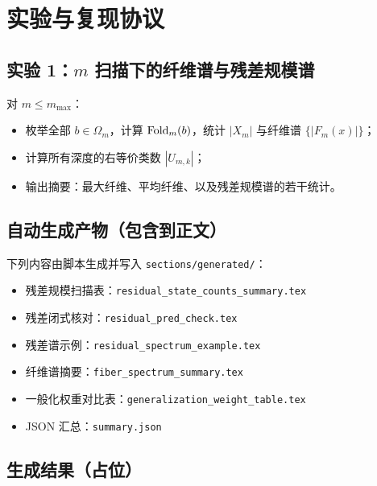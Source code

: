 \section{实验与复现协议}\label{sec:exp}

\subsection{\texorpdfstring{实验 1：$m$ 扫描下的纤维谱与残差规模谱}{实验 1：m 扫描下的纤维谱与残差规模谱}}
对 $m\le m_{\max}$：
\begin{itemize}
  \item 枚举全部 $b\in\Omega_m$，计算 $\mathrm{Fold}_m(b)$，统计 $|X_m|$ 与纤维谱 $\{|F_m(x)|\}$；
  \item 计算所有深度的右等价类数 $|U_{m,k}|$；
  \item 输出摘要：最大纤维、平均纤维、以及残差规模谱的若干统计。
\end{itemize}

\subsection{自动生成产物（包含到正文）}
下列内容由脚本生成并写入 \verb|sections/generated/|：
\begin{itemize}
  \item 残差规模扫描表：\verb|residual_state_counts_summary.tex|
  \item 残差闭式核对：\verb|residual_pred_check.tex|
  \item 残差谱示例：\verb|residual_spectrum_example.tex|
  \item 纤维谱摘要：\verb|fiber_spectrum_summary.tex|
  \item 一般化权重对比表：\verb|generalization_weight_table.tex|
  \item JSON 汇总：\verb|summary.json|
\end{itemize}

\FloatBarrier
\subsection{生成结果（占位）}






